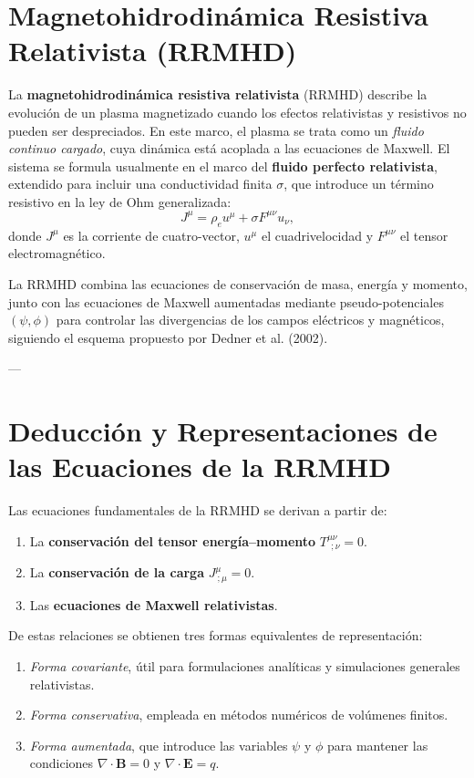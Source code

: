 \section{Magnetohidrodinámica Resistiva Relativista (RRMHD)}
La \textbf{magnetohidrodinámica resistiva relativista} (RRMHD) describe la evolución de un plasma magnetizado cuando los efectos relativistas y resistivos no pueden ser despreciados. 
En este marco, el plasma se trata como un \textit{fluido continuo cargado}, cuya dinámica está acoplada a las ecuaciones de Maxwell.  
El sistema se formula usualmente en el marco del \textbf{fluido perfecto relativista}, extendido para incluir una conductividad finita $\sigma$, que introduce un término resistivo en la ley de Ohm generalizada:
\[
J^\mu = \rho_e u^\mu + \sigma F^{\mu\nu}u_\nu,
\]
donde $J^\mu$ es la corriente de cuatro-vector, $u^\mu$ el cuadrivelocidad y $F^{\mu\nu}$ el tensor electromagnético.

La RRMHD combina las ecuaciones de conservación de masa, energía y momento, junto con las ecuaciones de Maxwell aumentadas mediante pseudo-potenciales $(\psi, \phi)$ para controlar las divergencias de los campos eléctricos y magnéticos, siguiendo el esquema propuesto por Dedner et al. (2002).

---

\section{Deducción y Representaciones de las Ecuaciones de la RRMHD}
Las ecuaciones fundamentales de la RRMHD se derivan a partir de:
\begin{enumerate}
    \item La \textbf{conservación del tensor energía–momento} $T^{\mu\nu}_{\ \ ;\nu}=0$.
    \item La \textbf{conservación de la carga} $J^\mu_{\ ;\mu}=0$.
    \item Las \textbf{ecuaciones de Maxwell relativistas}.
\end{enumerate}

De estas relaciones se obtienen tres formas equivalentes de representación:
\begin{enumerate}
    \item \textit{Forma covariante}, útil para formulaciones analíticas y simulaciones generales relativistas.
    \item \textit{Forma conservativa}, empleada en métodos numéricos de volúmenes finitos.
    \item \textit{Forma aumentada}, que introduce las variables $\psi$ y $\phi$ para mantener las condiciones $\nabla \cdot \mathbf{B}=0$ y $\nabla \cdot \mathbf{E}=q$.
\end{enumerate}

